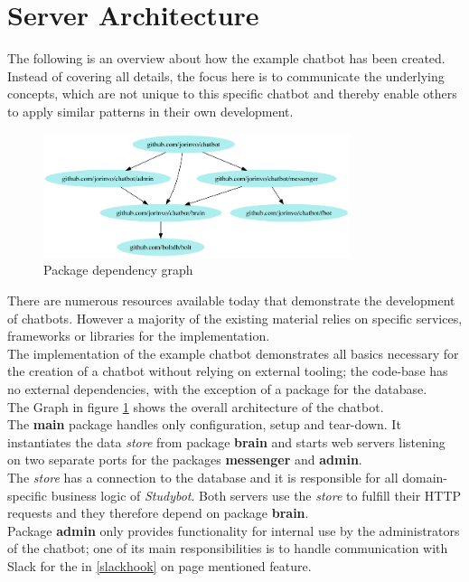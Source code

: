 \section{Server Architecture}

The following is an overview about how the example chatbot has been created.
\\
Instead of covering all details, the focus here is to communicate the underlying concepts,
which are not unique to this specific chatbot and thereby enable others to apply similar patterns in their own development.
\\

\begin{figure}[h]
  \centering
  \includegraphics[width=0.8\textwidth]{images/internal-deps.png}
  \caption{Package dependency graph\protect\footnotemark}
	\label{fig:internal-deps}
\end{figure}

There are numerous resources available today that demonstrate the development of chatbots.
However a majority of the existing material relies on specific services, frameworks or libraries for the implementation.
\\
The implementation of the example chatbot demonstrates all basics necessary for the creation of a chatbot
without relying on external tooling;
the code-base has no external dependencies, with the exception of a package for the database.
\\

The Graph in figure \ref{fig:internal-deps} shows the overall architecture of the chatbot.
\\
The \textbf{main} package handles only configuration, setup and tear-down.
It instantiates the data \emph{store} from package \textbf{brain}
and starts web servers listening on two separate ports for the packages \textbf{messenger} and \textbf{admin}.
\\

The \emph{store} has a connection to the database and it is responsible for all domain-specific business logic of \emph{Studybot}.
Both servers use the \emph{store} to fulfill their HTTP requests and they therefore depend on package \textbf{brain}.
\\
Package \textbf{admin} only provides functionality for internal use by the administrators of the chatbot;
one of its main responsibilities is to handle communication with Slack
for the in \ref{slackhook} on page \pageref{slackhook} mentioned feature.
\\

